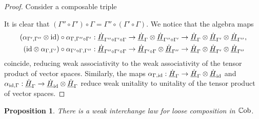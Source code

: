 \documentclass[11pt]{report}
\newtheorem{prop}[theorem]{Proposition}
\theoremstyle{definition}
\theoremstyle{remark}
\theoremstyle{remark}
\newcommand{\id}{\textnormal{id}}
\begin{document}
\begin{proof}
Consider a composable triple
\begin{center}
\end{center}
It is clear that $(\Gamma'' \circ \Gamma') \circ \Gamma = \Gamma'' \circ (\Gamma' \circ \Gamma)$. We notice that the algebra maps
\begin{align*}
(\alpha_{\Gamma',\Gamma''} \otimes \id) \circ \alpha_{\Gamma,\Gamma'' \circ \Gamma'}&: \underline{\dot H}_{\Gamma'' \circ \Gamma' \circ \Gamma} \to \underline{\dot H}_\Gamma \otimes \underline{\dot H}_{\Gamma'' \circ \Gamma'} \to \underline{\dot H}_\Gamma \otimes \underline{\dot H}_{\Gamma'} \otimes \underline{\dot H}_{\Gamma''}, \\
(\id \otimes \alpha_{\Gamma,\Gamma'}) \circ \alpha_{\Gamma' \circ \Gamma,\Gamma''}&: \underline{\dot H}_{\Gamma'' \circ \Gamma' \circ \Gamma} \to \underline{\dot H}_{\Gamma' \circ \Gamma} \otimes \underline{\dot H}_{\Gamma''} \to \underline{\dot H}_\Gamma \otimes \underline{\dot H}_{\Gamma'} \otimes \underline{\dot H}_{\Gamma''}
\end{align*}
coincide, reducing weak associativity to the weak associativity of the tensor product of vector spaces. Similarly, the maps $\alpha_{\Gamma,\id}: \underline{\dot H}_\Gamma \to \underline{\dot H}_\Gamma \otimes \underline{\dot H}_\id$ and $\alpha_{\id,\Gamma}: \underline{\dot H}_\Gamma \to \underline{\dot H}_\id \otimes \underline{\dot H}_\Gamma$ reduce weak unitality to unitality of the tensor product of vector spaces.
\end{proof}

\begin{prop}
There is a weak interchange law for loose composition in $\mathbb{C}\textnormal{ob}$.
\end{prop}
\end{document}

